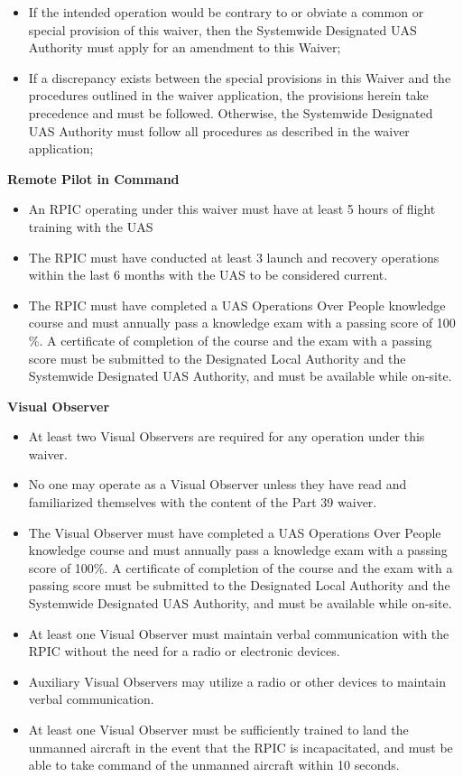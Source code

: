 \documentclass[
]{book}
\providecommand{\tightlist}{%
  \setlength{\itemsep}{0pt}\setlength{\parskip}{0pt}}
\begin{document}
\begin{itemize}
\item
  If the intended operation would be contrary to or obviate a common or special provision of this waiver, then the Systemwide Designated UAS Authority must apply for an amendment to this Waiver;
\item
  If a discrepancy exists between the special provisions in this Waiver and the procedures outlined in the waiver application, the provisions herein take precedence and must be followed. Otherwise, the Systemwide Designated UAS Authority must follow all procedures as described in the waiver application;
\end{itemize}

\textbf{Remote Pilot in Command}

\begin{itemize}
\tightlist
\item
  An RPIC operating under this waiver must have at least 5 hours of flight training with the UAS
\item
  The RPIC must have conducted at least 3 launch and recovery operations within the last 6 months with the UAS to be considered current.
\item
  The RPIC must have completed a UAS Operations Over People knowledge course and must annually pass a knowledge exam with a passing score of 100\(\%\). A certificate of completion of the course and the exam with a passing score must be submitted to the Designated Local Authority and the Systemwide Designated UAS Authority, and must be available while on-site.
\end{itemize}

\textbf{Visual Observer}

\begin{itemize}
\tightlist
\item
  At least two Visual Observers are required for any operation under this waiver.
\item
  No one may operate as a Visual Observer unless they have read and familiarized themselves with the content of the Part 39 waiver.
\item
  The Visual Observer must have completed a UAS Operations Over People knowledge course and must annually pass a knowledge exam with a passing score of 100\(\%\). A certificate of completion of the course and the exam with a passing score must be submitted to the Designated Local Authority and the Systemwide Designated UAS Authority, and must be available while on-site.
\item
  At least one Visual Observer must maintain verbal communication with the RPIC without the need for a radio or electronic devices.
\item
  Auxiliary Visual Observers may utilize a radio or other devices to maintain verbal communication.
\item
  At least one Visual Observer must be sufficiently trained to land the unmanned aircraft in the event that the RPIC is incapacitated, and must be able to take command of the unmanned aircraft within 10 seconds.
\end{itemize}
\end{document}
